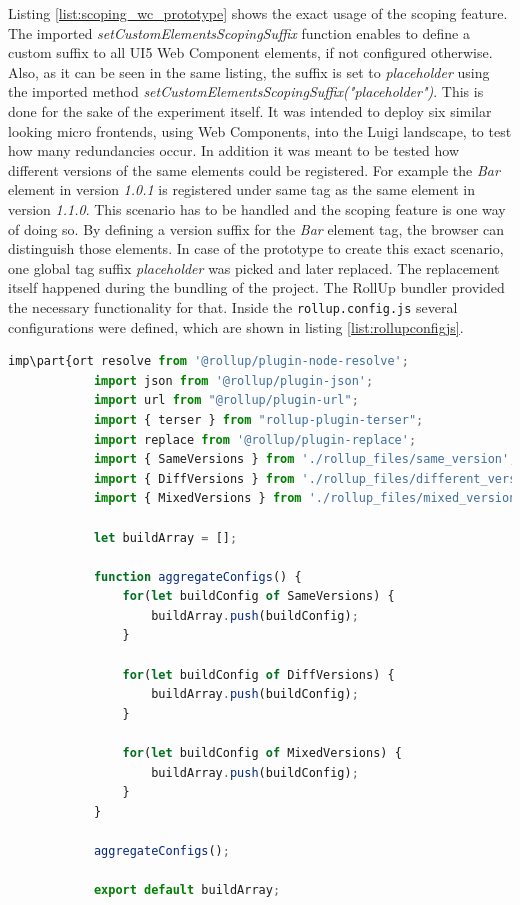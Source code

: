 Listing \ref{list:scoping_wc_prototype} shows the exact usage of the scoping feature. 
The imported \textit{setCustomElementsScopingSuffix} function enables to define a custom suffix to all UI5 Web Component elements, if not configured otherwise. Also, as it can be seen in the same listing, the suffix is set to \textit{placeholder} using the imported method \textit{setCustomElementsScopingSuffix("placeholder")}.
This is done for the sake of the experiment itself. It was intended to deploy six similar looking micro frontends, using Web Components, into the Luigi landscape, to test how many redundancies occur. In addition it was meant to be tested how different versions of the same elements could be registered. For example the \textit{Bar} element in version \textit{1.0.1} is registered under same tag as the same element in version \textit{1.1.0}. This scenario has to be handled and the scoping feature is one way of doing so.
By defining a version suffix for the \textit{Bar} element tag, the browser can distinguish those elements.
In case of the prototype to create this exact scenario, one global tag suffix \textit{placeholder} was picked and later replaced. The replacement itself happened during the bundling of the project. The RollUp bundler provided the necessary functionality for that.
Inside the \texttt{rollup.config.js} several configurations were defined, which are shown in listing \ref{list:rollupconfigjs}.
	
	\begin{lstlisting}[language=JavaScript, caption=Content of the \texttt{rollup.config.js}, label=list:rollupconfigjs,  xleftmargin=.01\textwidth, xrightmargin=.01\textwidth]
		imp\part{ort resolve from '@rollup/plugin-node-resolve';
			import json from '@rollup/plugin-json';
			import url from "@rollup/plugin-url";
			import { terser } from "rollup-plugin-terser";
			import replace from '@rollup/plugin-replace';
			import { SameVersions } from './rollup_files/same_version';
			import { DiffVersions } from './rollup_files/different_version';
			import { MixedVersions } from './rollup_files/mixed_version';
			
			let buildArray = [];
			
			function aggregateConfigs() {
				for(let buildConfig of SameVersions) {
					buildArray.push(buildConfig);
				}
				
				for(let buildConfig of DiffVersions) {
					buildArray.push(buildConfig);
				}
				
				for(let buildConfig of MixedVersions) {
					buildArray.push(buildConfig);
				}
			}
			
			aggregateConfigs();
			
			export default buildArray;
		\end{lstlisting}
		
